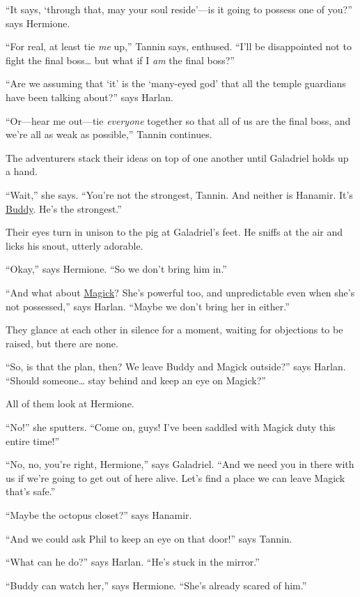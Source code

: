 \documentclass[smalldemyvopaper,11pt,twoside,onecolumn,openright,extrafontsizes]{memoir}
\begin{document}
``It says, `through that, may your soul reside'---is it going to possess
one of you?'' says Hermione.

``For real, at least tie \emph{me} up,'' Tannin says, enthused. ``I'll
be disappointed not to fight the final boss\ldots{} but what if I
\emph{am} the final boss?''

``Are we assuming that `it' is the `many-eyed god' that all the temple
guardians have been talking about?'' says Harlan.

``Or---hear me out---tie \emph{everyone} together so that all of us are
the final boss, and we're all as weak as possible,'' Tannin continues.

The adventurers stack their ideas on top of one another until Galadriel
holds up a hand.

``Wait,'' she says. ``You're not the strongest, Tannin. And neither is
Hanamir. It's \href{/characters/buddy/}{Buddy}. He's the strongest.''

Their eyes turn in unison to the pig at Galadriel's feet. He sniffs at
the air and licks his snout, utterly adorable.

``Okay,'' says Hermione. ``So we don't bring him in.''

``And what about \href{/characters/magick/}{Magick}? She's powerful too,
and unpredictable even when she's not possessed,'' says Harlan. ``Maybe
we don't bring her in either.''

They glance at each other in silence for a moment, waiting for
objections to be raised, but there are none.

``So, is that the plan, then? We leave Buddy and Magick outside?'' says
Harlan. ``Should someone\ldots{} stay behind and keep an eye on
Magick?''

All of them look at Hermione.

``No!'' she sputters. ``Come on, guys! I've been saddled with Magick
duty this entire time!''

``No, no, you're right, Hermione,'' says Galadriel. ``And we need you in
there with us if we're going to get out of here alive. Let's find a
place we can leave Magick that's safe.''

``Maybe the octopus closet?'' says Hanamir.

``And we could ask Phil to keep an eye on that door!'' says Tannin.

``What can he do?'' says Harlan. ``He's stuck in the mirror.''

``Buddy can watch her,'' says Hermione. ``She's already scared of him.''
\end{document}
